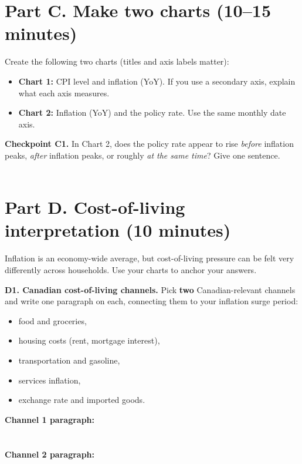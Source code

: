 \documentclass[12pt]{article}
\begin{document}
\section*{Part C. Make two charts (10--15 minutes)}
Create the following two charts (titles and axis labels matter):
\begin{itemize}
\item \textbf{Chart 1:} CPI level and inflation (YoY). If you use a secondary axis, explain what each axis measures.
\item \textbf{Chart 2:} Inflation (YoY) and the policy rate. Use the same monthly date axis.
\end{itemize}

\vspace{0.5em}
\textbf{Checkpoint C1.} In Chart 2, does the policy rate appear to rise \emph{before} inflation peaks, \emph{after} inflation peaks, or roughly \emph{at the same time}? Give one sentence.\\[0.75em]
\underline{\hspace{0.9\linewidth}}\\[0.75em]
\underline{\hspace{0.9\linewidth}}

\section*{Part D. Cost-of-living interpretation (10 minutes)}
Inflation is an economy-wide average, but cost-of-living pressure can be felt very differently across households. Use your charts to anchor your answers.

\vspace{0.5em}
\textbf{D1. Canadian cost-of-living channels.} Pick \textbf{two} Canadian-relevant channels and write one paragraph on each, connecting them to your inflation surge period:
\begin{itemize}
\item food and groceries,
\item housing costs (rent, mortgage interest),
\item transportation and gasoline,
\item services inflation,
\item exchange rate and imported goods.
\end{itemize}

\vspace{0.5em}
\textbf{Channel 1 paragraph:}\\[0.75em]
\underline{\hspace{0.9\linewidth}}\\[0.75em]
\underline{\hspace{0.9\linewidth}}\\[0.75em]
\underline{\hspace{0.9\linewidth}}
\newpage
\vspace{0.5em}
\textbf{Channel 2 paragraph:}\\[0.75em]
\underline{\hspace{0.9\linewidth}}\\[0.75em]
\underline{\hspace{0.9\linewidth}}\\[0.75em]
\underline{\hspace{0.9\linewidth}}
\end{document}
